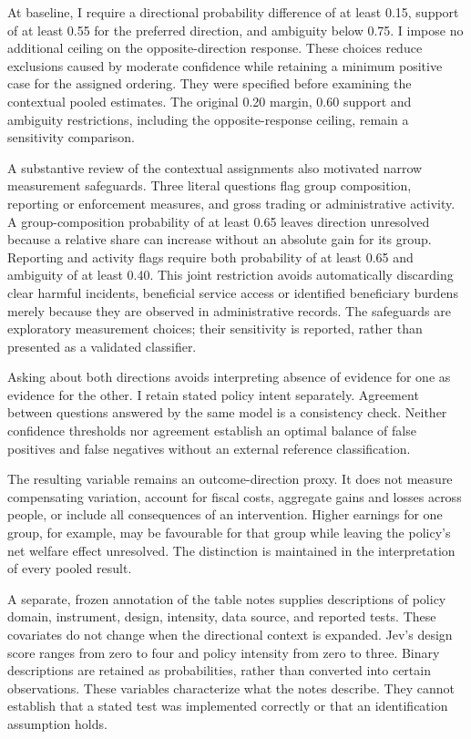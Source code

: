 \documentclass[11pt]{article}
\begin{document}
At baseline, I require a directional probability difference of at least 0.15, support of at least 0.55 for the preferred direction, and ambiguity below 0.75. I impose no additional ceiling on the opposite-direction response. These choices reduce exclusions caused by moderate confidence while retaining a minimum positive case for the assigned ordering. They were specified before examining the contextual pooled estimates. The original 0.20 margin, 0.60 support and ambiguity restrictions, including the opposite-response ceiling, remain a sensitivity comparison.

A substantive review of the contextual assignments also motivated narrow measurement safeguards. Three literal questions flag group composition, reporting or enforcement measures, and gross trading or administrative activity. A group-composition probability of at least 0.65 leaves direction unresolved because a relative share can increase without an absolute gain for its group. Reporting and activity flags require both probability of at least 0.65 and ambiguity of at least 0.40. This joint restriction avoids automatically discarding clear harmful incidents, beneficial service access or identified beneficiary burdens merely because they are observed in administrative records. The safeguards are exploratory measurement choices; their sensitivity is reported, rather than presented as a validated classifier.

Asking about both directions avoids interpreting absence of evidence for one as evidence for the other. I retain stated policy intent separately. Agreement between questions answered by the same model is a consistency check. Neither confidence thresholds nor agreement establish an optimal balance of false positives and false negatives without an external reference classification.

The resulting variable remains an outcome-direction proxy. It does not measure compensating variation, account for fiscal costs, aggregate gains and losses across people, or include all consequences of an intervention. Higher earnings for one group, for example, may be favourable for that group while leaving the policy's net welfare effect unresolved. The distinction is maintained in the interpretation of every pooled result.

A separate, frozen annotation of the table notes supplies descriptions of policy domain, instrument, design, intensity, data source, and reported tests. These covariates do not change when the directional context is expanded. Jev's design score ranges from zero to four and policy intensity from zero to three. Binary descriptions are retained as probabilities, rather than converted into certain observations. These variables characterize what the notes describe. They cannot establish that a stated test was implemented correctly or that an identification assumption holds.
\end{document}
